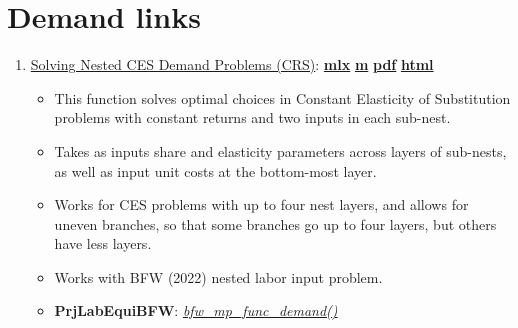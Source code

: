 \documentclass[
]{book}
\providecommand{\tightlist}{%
  \setlength{\itemsep}{0pt}\setlength{\parskip}{0pt}}
\begin{document}
\hypertarget{demand-links}{%
\section{Demand links}\label{demand-links}}

\begin{enumerate}
\def\labelenumi{\arabic{enumi}.}
\tightlist
\item
  \href{https://fanwangecon.github.io/PrjLabEquiBFW/PrjLabEquiBFW/doc/solvedemand/htmlpdfm/bfwx_crs_nested_ces.html}{Solving Nested CES Demand Problems (CRS)}: \href{https://github.com/FanWangEcon/PrjLabEquiBFW/blob/master/PrjLabEquiBFW/doc/solvedemand/bfwx_crs_nested_ces.mlx}{\textbf{mlx}} \textbar{} \href{https://github.com/FanWangEcon/PrjLabEquiBFW/blob/master/PrjLabEquiBFW/doc/solvedemand/htmlpdfm/bfwx_crs_nested_ces.m}{\textbf{m}} \textbar{} \href{https://github.com/FanWangEcon/PrjLabEquiBFW/blob/master/PrjLabEquiBFW/doc/solvedemand/htmlpdfm/bfwx_crs_nested_ces.pdf}{\textbf{pdf}} \textbar{} \href{https://fanwangecon.github.io/PrjLabEquiBFW/PrjLabEquiBFW/doc/solvedemand/htmlpdfm/bfwx_crs_nested_ces.html}{\textbf{html}}

  \begin{itemize}
  \tightlist
  \item
    This function solves optimal choices in Constant Elasticity of Substitution problems with constant returns and two inputs in each sub-nest.
  \item
    Takes as inputs share and elasticity parameters across layers of sub-nests, as well as input unit costs at the bottom-most layer.
  \item
    Works for CES problems with up to four nest layers, and allows for uneven branches, so that some branches go up to four layers, but others have less layers.
  \item
    Works with BFW (2022) nested labor input problem.
  \item
    \textbf{PrjLabEquiBFW}: \emph{\href{https://github.com/FanWangEcon/PrjLabEquiBFW/blob/main/PrjLabEquiBFW/solvedemand/bfw_mp_func_demand.m}{bfw\_mp\_func\_demand()}}
  \end{itemize}
\end{enumerate}

  
\end{document}
